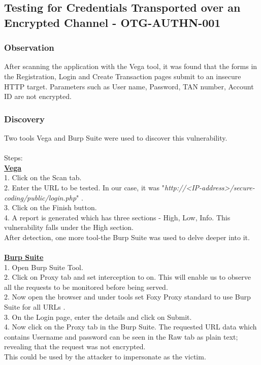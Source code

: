 \subsection{Testing for Credentials Transported over an Encrypted Channel - OTG-AUTHN-001}


\subsubsection{Observation}
After scanning the application with the Vega tool, it was found that the forms in the Registration, Login and Create Transaction pages submit to an insecure HTTP target. Parameters such as User name, Password, TAN number, Account ID are not encrypted. 

\subsubsection{Discovery}
Two tools Vega and Burp Suite were used to discover this vulnerability.\\\\
Steps: \\
\underline{\textbf{Vega}}\\
1. Click on the Scan tab. \\
2. Enter the URL to be tested. In our case, it was "\textit{http://<IP-address>/secure-coding/public/login.php}" .\\
3. Click on the Finish button. \\
4. A report is generated which has three sections - High, Low, Info. This vulnerability falls under the High section.\\
After detection, one more tool-the Burp Suite was used to delve deeper into it.\\ \\
\underline{\textbf{Burp Suite}}\\
1. Open Burp Suite Tool.\\
2. Click on Proxy tab and set  interception to on. This will enable us to observe all the requests to be monitored before being served. \\
2. Now open the browser and under tools set Foxy Proxy standard to use Burp Suite for all URLs .\\
3. On the Login page, enter the details and click on Submit.\\
4. Now click  on the Proxy tab in the Burp Suite. The requested URL data which contains Username and password can be seen in the Raw tab as plain text; revealing that the request was not encrypted. \\
This could be used by the attacker to impersonate as the victim.

